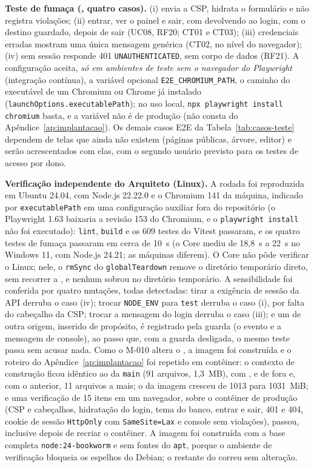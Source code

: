 \textbf{Teste de fumaça (, quatro casos).} (i)  envia a CSP, hidrata o formulário e não registra violações; (ii) entrar, ver o painel e sair, com  devolvendo ao login, com o destino guardado, depois de sair (UC08, RF20; CT01 e CT03); (iii) credenciais erradas mostram uma única mensagem genérica (CT02, no nível do navegador); (iv)  sem sessão responde 401 \texttt{UNAUTHENTICATED}, sem corpo de dados (RF21). A configuração aceita, \emph{só em ambientes de teste sem o navegador do Playwright} (integração contínua), a variável opcional \texttt{E2E\_CHROMIUM\_PATH}, o caminho do executável de um Chromium ou Chrome já instalado (\texttt{launchOptions.executablePath}); no uso local, \texttt{npx playwright install chromium} basta, e a variável não é de produção (não consta do Apêndice~\ref{ap:implantacao}). Os demais casos E2E da Tabela~\ref{tab:casos-teste} dependem de telas que ainda não existem (páginas públicas, árvore, editor) e serão acrescentados com elas, com o segundo usuário previsto para os testes de acesso por dono.

\textbf{Verificação independente do Arquiteto (Linux).} A rodada foi reproduzida em Ubuntu 24.04, com Node.js 22.22.0 e o Chromium 141 da máquina, indicado por \texttt{executablePath} em uma configuração auxiliar fora do repositório (o Playwright 1.63 baixaria a revisão 153 do Chromium, e o \texttt{playwright install} não foi executado): \texttt{lint}, \texttt{build} e os 609 testes do Vitest passaram, e os quatro testes de fumaça passaram em cerca de 10~s (o Core mediu de 18,8~s a 22~s no Windows 11, com Node.js 24.21; as máquinas diferem). O Core não pôde verificar o Linux; nele, o \texttt{rmSync} do \texttt{globalTeardown} remove o diretório temporário direto, sem recorrer a , e nenhum  sobrou no diretório temporário. A sensibilidade foi conferida por quatro mutações, todas detectadas: tirar a exigência de sessão da API derruba o caso (iv); trocar \texttt{NODE\_ENV} para \texttt{test} derruba o caso (i), por falta do cabeçalho da CSP; trocar a mensagem do login derruba o caso (iii); e um  de outra origem, inserido de propósito, é registrado pela guarda (o evento e a mensagem de console), ao passo que, com a guarda desligada, o mesmo teste passa sem acusar nada. Como o M-010 altera o , a imagem foi construída e o roteiro do Apêndice~\ref{ap:implantacao} foi repetido em contêiner: o contexto de construção ficou idêntico ao da \texttt{main} (91 arquivos, 1,3~MB), com ,  e  de fora e, com o  anterior, 11 arquivos a mais; o  da imagem cresceu de 1013 para 1031~MiB; e uma verificação de 15 itens em um navegador, sobre o contêiner de produção (CSP e cabeçalhos, hidratação do login, tema do banco, entrar e sair, 401 e 404, cookie de sessão \texttt{HttpOnly} com \texttt{SameSite=Lax} e console sem violações), passou, inclusive depois de recriar o contêiner. A imagem foi construída com a base completa \texttt{node:24-bookworm} e sem fontes do \texttt{apt}, porque o ambiente de verificação bloqueia os espelhos do Debian; o restante do  correu sem alteração.

